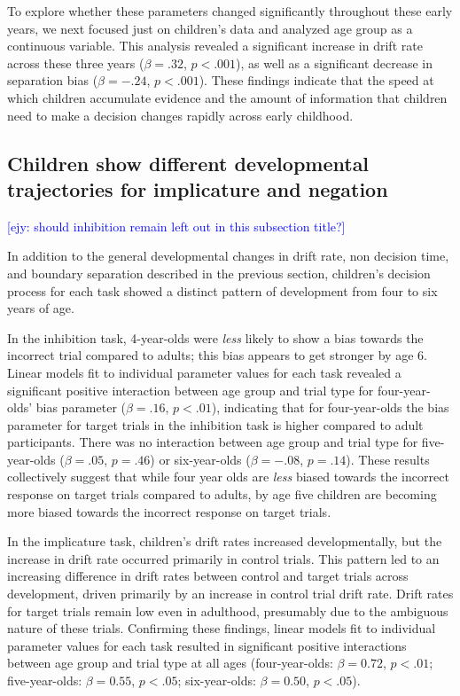 \documentclass[10pt,letterpaper]{article}
\newcommand{\ejy}[1]{\textcolor{Blue}{[ejy: #1]}}
\begin{document}
To explore whether these parameters changed significantly throughout these early years, we next focused just on children's data and analyzed age group as a continuous variable. This analysis revealed a significant increase in drift rate across these three years ($\beta = .32$, $p < .001$), as well as a significant decrease in separation bias ($\beta = -.24$, $p < .001$). These findings indicate that the speed at which children accumulate evidence and the amount of information that children need to make a decision changes rapidly across early childhood.

\subsection{Children show different developmental trajectories for implicature and negation} \ejy{should inhibition remain left out in this subsection title?}

In addition to the general developmental changes in drift rate, non decision time, and boundary separation described in the previous section, children's decision process for each task showed a distinct pattern of development from four to six years of age.

In the inhibition task, 4-year-olds were \emph{less} likely to show a bias towards the incorrect trial compared to adults; this bias appears to get stronger by age 6. Linear models fit to individual parameter values for each task revealed a significant positive interaction between age group and trial type for four-year-olds' bias parameter ($\beta = .16$, $p< .01$), indicating that for four-year-olds the bias parameter for target trials in the inhibition task is higher compared to adult participants. There was no interaction between age group and trial type for five-year-olds ($\beta = .05$, $p = .46$) or six-year-olds ($\beta = -.08$, $p = .14$). These results collectively suggest that while four year olds are \emph{less} biased towards the incorrect response on target trials compared to adults, by age five children are becoming more biased towards the incorrect response on target trials.

In the implicature task, children's drift rates increased developmentally, but the increase in drift rate occurred primarily in control trials. This pattern led to an increasing difference in drift rates between control and target trials across development, driven primarily by an increase in control trial drift rate. Drift rates for target trials remain low even in adulthood, presumably due to the ambiguous nature of these trials. Confirming these findings, linear models fit to individual parameter values for each task resulted in significant positive interactions between age group and trial type at all ages (four-year-olds: $\beta = 0.72$, $p <.01$; five-year-olds: $\beta = 0.55$, $p <.05$; six-year-olds: $\beta = 0.50$, $p <.05$).
\end{document}
